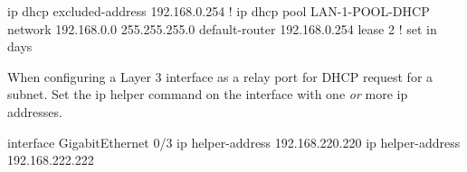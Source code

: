 \begin{txt}
ip dhcp excluded-address 192.168.0.254
!
ip dhcp pool LAN-1-POOL-DHCP
 network 192.168.0.0 255.255.255.0
 default-router 192.168.0.254
 lease 2 ! set in days
\end{txt}

When configuring a Layer 3 interface as a relay port for DHCP request for a subnet. Set the ip helper command on the interface with one \textit{or} more ip addresses.

\begin{txt}
interface GigabitEthernet 0/3
 ip helper-address 192.168.220.220
 ip helper-address 192.168.222.222
\end{txt}
